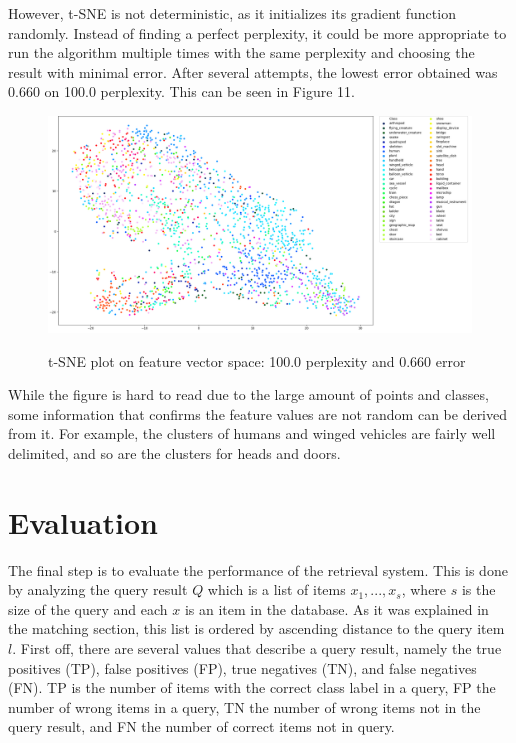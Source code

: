 \documentclass{bigdata}
\begin{document}
However, t-SNE is not deterministic, as it initializes its gradient function randomly. Instead of finding a perfect perplexity, it could be more appropriate to run the algorithm multiple times with the same perplexity and choosing the result with minimal error. After several attempts, the lowest error obtained was 0.660 on 100.0 perplexity. This can be seen in Figure 11. \\
\begin{figure}[!h]
	\includegraphics[width=1\linewidth]{Pictures/perp100err0-660.png}
	\label{fig:fig1}
	\caption{t-SNE plot on feature vector space: 100.0 perplexity and 0.660 error}
\end{figure}

\noindent While the figure is hard to read due to the large amount of points and classes, some information that confirms the feature values are not random can be derived from it. For example, the clusters of humans and winged vehicles are fairly well delimited, and so are the clusters for heads and doors.

\section{Evaluation}
The final step is to evaluate the performance of the retrieval system. This is done by analyzing the query result $Q$ which is a list of items ${x_1,...,x_s}$, where $s$ is the size of the query and each $x$ is an item in the database. As it was explained in the matching section, this list is ordered by ascending distance to the query item $l$. First off, there are several values that describe a query result, namely the true positives (TP), false positives (FP), true negatives (TN), and false negatives (FN). TP is the number of items with the correct class label in a query, FP the number of wrong items in a query, TN the number of wrong items not in the query result, and FN the number of correct items not in query.
\end{document}
